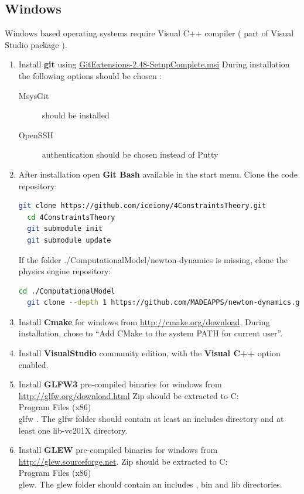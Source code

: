 \documentclass[11]{article}
\begin{document}
\subsection{Windows}
Windows based operating systems require Visual C++ compiler ( part of Visual Studio package ).
\begin{enumerate}

  \item Install \textbf{git} using 
    \href{https://github.com/gitextensions/gitextensions/releases/latest}{GitExtensions-2.48-SetupComplete.msi} 
    During installation the following options should be chosen : 
    \begin{description}
	\item [MsysGit] should be installed 
	\item [OpenSSH] authentication should be chosen instead of Putty
    \end{description}

  \item After installation open \textbf{Git Bash} available in the start menu. Clone the code repository:   
    \begin{lstlisting}[language=bash]
  git clone https://github.com/iceiony/4ConstraintsTheory.git 
  cd 4ConstraintsTheory
  git submodule init
  git submodule update
    \end{lstlisting}

    If the folder ./ComputationalModel/newton-dynamics is missing, clone the physics engine repository:
    \begin{lstlisting}[language=bash]
  cd ./ComputationalModel
  git clone --depth 1 https://github.com/MADEAPPS/newton-dynamics.git 
    \end{lstlisting}

  \item Install \textbf{Cmake} for windows from \url{http://cmake.org/download}. 
    During installation, chose to ``Add CMake to the system PATH for current user''.

  \item Install \textbf{VisualStudio} community edition, with the \textbf{Visual C++} option enabled. 

  \item Install \textbf{GLFW3} pre-compiled binaries for windows from \url{http://glfw.org/download.html}
    Zip should be extracted to C:\\Program Files (x86)\\glfw . The glfw folder should contain at least an includes directory
    and at least one lib-vc201X directory.

  \item Install \textbf{GLEW} pre-compiled binaries for windows from \url{http://glew.sourceforge.net}. 
    Zip should be extracted to C:\\Program Files (x86)\\glew. The glew folder should contain an includes , bin and lib directories.

\end{enumerate}
\end{document}
